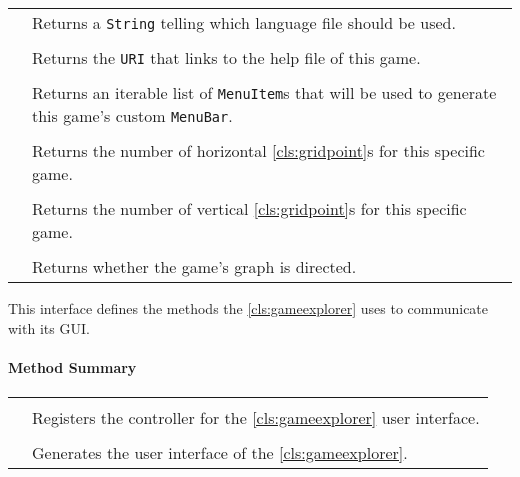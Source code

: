 \begin{longtable}{Lp{10cm}}
	& Returns a \texttt{String} telling which language file should be used. \\
	 \\
	& Returns the \texttt{URI} that links to the help file of this game. \\
	 \\
	& Returns an iterable list of \texttt{MenuItem}s that will be used to generate this game's custom \texttt{MenuBar}. \\
	 \\
	& Returns the number of horizontal \ref{cls:gridpoint}s for this specific game. \\
	 \\
	& Returns the number of vertical \ref{cls:gridpoint}s for this specific game. \\
	 \\
	& Returns whether the game's graph is directed. \\
	\hline
\end{longtable}

\pagebreak

This interface defines the methods the \ref{cls:gameexplorer} uses to communicate with its \gls{GUI}. \\

\centerdash

\paragraph*{Method Summary}
\paragraph*{}
\begin{longtable}{Lp{10cm}}
	\startmethodtable
	 \\
	& Registers the controller for the \ref{cls:gameexplorer} user interface. \\
	 \\
	& Generates the user interface of the \ref{cls:gameexplorer}. \\
	\hline
\end{longtable}


